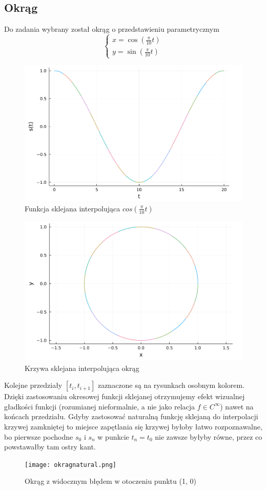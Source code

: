 \documentclass[11pt,wide]{article}
\begin{document}
\subsection{Okrąg}
Do zadania wybrany został okrąg o przedstawieniu parametrycznym
\begin{equation}
    \begin{cases}
    x = \cos(\frac{\pi}{10} t)\\
    y = \sin(\frac{\pi}{10} t)
    \end{cases}
\end{equation}
\begin{figure}[!htb]
    \centering
    \includegraphics[width=120mm]{okragsx.png}
    \caption{Funkcja sklejana interpolująca $cos(\frac{\pi}{10}t)$}
    \label{fig:my_label}
\end{figure}
\begin{figure}[!htb]
    \centering
    \includegraphics[width=120mm]{okrag.png}
    \caption{Krzywa sklejana interpolująca okrąg}
    \label{fig:my_label}
\end{figure}
Kolejne przedziały $[t_i, t_{i+1}]$ zaznaczone są na rysunkach osobnym kolorem. Dzięki zastosowaniu okresowej funkcji sklejanej otrzymujemy efekt wizualnej gładkości funkcji (rozumianej nieformalnie, a nie jako relacja $f \in C^\infty$) nawet na końcach przedziału. Gdyby zastosować naturalną funkcję sklejaną do interpolacji krzywej zamkniętej to miejsce zapętlania się krzywej byłoby łatwo rozpoznawalne, bo pierwsze pochodne $s_0$ i $s_n$ w punkcie $t_n=t_0$ nie zawsze byłyby równe, przez co powstawałby tam ostry kant.
\begin{figure}[!htb]
    \centering
    \texttt{[image: okragnatural.png]}
    \caption{Okrąg z widocznym błędem w otoczeniu punktu (1, 0) }
    \label{fig:my_label}
\end{figure}
\end{document}
